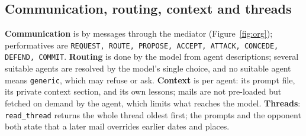 \documentclass[11pt,a4paper]{article}
\newcommand{\code}[1]{\texttt{#1}}
\begin{document}
\subsection{Communication, routing, context and threads}
\textbf{Communication} is by messages through the mediator (Figure~\ref{fig:org}); performatives are
\code{REQUEST, ROUTE, PROPOSE, ACCEPT, ATTACK, CONCEDE, DEFEND, COMMIT}.
\textbf{Routing} is done by the model from agent descriptions; several suitable agents are resolved by the model's
single choice, and no suitable agent means \code{generic}, which may refuse or ask.
\textbf{Context} is per agent: its prompt file, its private context section, and its own lessons; mails are not
pre-loaded but fetched on demand by the agent, which limits what reaches the model.
\textbf{Threads}: \code{read\_thread} returns the whole thread oldest first; the prompts and the opponent both state
that a later mail overrides earlier dates and places.
\end{document}
